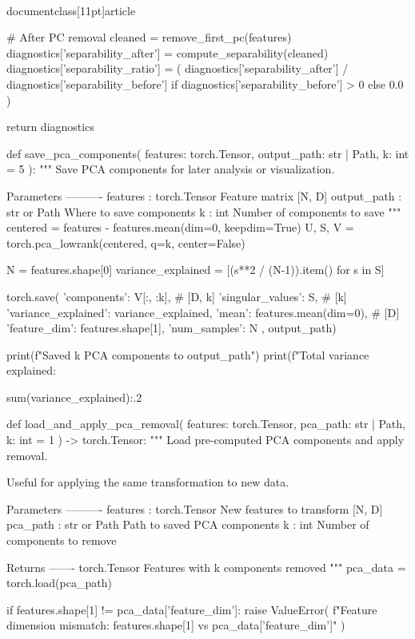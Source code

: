 \\documentclass[11pt]{article}
\begin{document}
\begin{CodeBlock}
{        # After PC removal
        cleaned = remove_first_pc(features)
        diagnostics['separability_after'] = compute_separability(cleaned)
        diagnostics['separability_ratio'] = (
            diagnostics['separability_after'] / diagnostics['separability_before']
            if diagnostics['separability_before'] > 0 else 0.0
        )
    
    return diagnostics


def save_pca_components(
    features: torch.Tensor,
    output_path: str | Path,
    k: int = 5
):
    """
    Save PCA components for later analysis or visualization.
    
    Parameters
    ----------
    features : torch.Tensor
        Feature matrix [N, D]
    output_path : str or Path
        Where to save components
    k : int
        Number of components to save
    """
    centered = features - features.mean(dim=0, keepdim=True)
    U, S, V = torch.pca_lowrank(centered, q=k, center=False)
    
    N = features.shape[0]
    variance_explained = [(s**2 / (N-1)).item() for s in S]
    
    torch.save({
        'components': V[:, :k],  # [D, k]
        'singular_values': S,  # [k]
        'variance_explained': variance_explained,
        'mean': features.mean(dim=0),  # [D]
        'feature_dim': features.shape[1],
        'num_samples': N
    }, output_path)
    
    print(f"Saved {k} PCA components to {output_path}")
    print(f"Total variance explained: {sum(variance_explained):.2%


def load_and_apply_pca_removal(
    features: torch.Tensor,
    pca_path: str | Path,
    k: int = 1
) -> torch.Tensor:
    """
    Load pre-computed PCA components and apply removal.
    
    Useful for applying the same transformation to new data.
    
    Parameters
    ----------
    features : torch.Tensor
        New features to transform [N, D]
    pca_path : str or Path
        Path to saved PCA components
    k : int
        Number of components to remove
    
    Returns
    -------
    torch.Tensor
        Features with k components removed
    """
    pca_data = torch.load(pca_path)
    
    if features.shape[1] != pca_data['feature_dim']:
        raise ValueError(
            f"Feature dimension mismatch: {features.shape[1]} vs {pca_data['feature_dim']}"
        )
    
}}
\end{CodeBlock}
\end{document}
